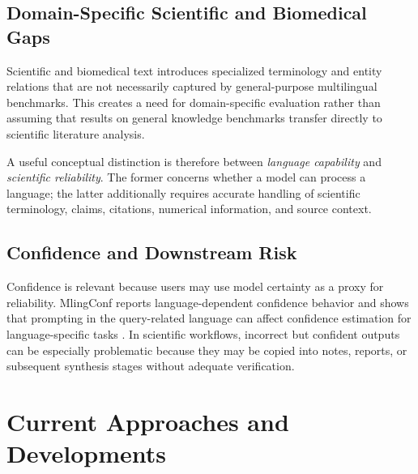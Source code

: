 \documentclass[acmsmall,screen,review]{acmart}
\begin{document}

\subsection{Domain-Specific Scientific and Biomedical Gaps}
\label{sec:domain-gaps}

Scientific and biomedical text introduces specialized terminology and entity relations that are not necessarily captured by general-purpose multilingual benchmarks. This creates a need for domain-specific evaluation rather than assuming that results on general knowledge benchmarks transfer directly to scientific literature analysis.

A useful conceptual distinction is therefore between \emph{language capability} and \emph{scientific reliability}. The former concerns whether a model can process a language; the latter additionally requires accurate handling of scientific terminology, claims, citations, numerical information, and source context.


\subsection{Confidence and Downstream Risk}
\label{sec:confidence-risk}

Confidence is relevant because users may use model certainty as a proxy for reliability. MlingConf reports language-dependent confidence behavior and shows that prompting in the query-related language can affect confidence estimation for language-specific tasks \citep{xue2024mlingconf}. In scientific workflows, incorrect but confident outputs can be especially problematic because they may be copied into notes, reports, or subsequent synthesis stages without adequate verification.


\section{Current Approaches and Developments}
\label{sec:approaches}
\end{document}
